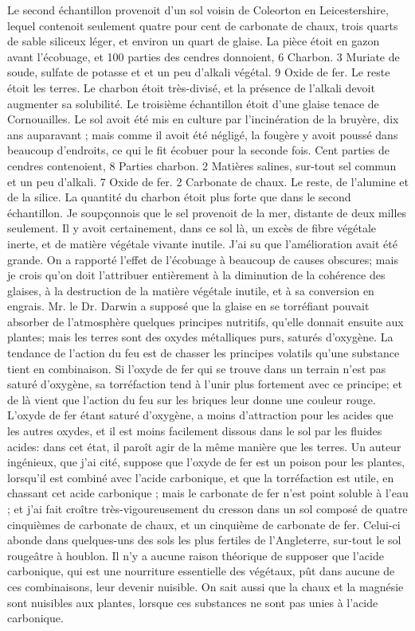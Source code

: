 Le second échantillon provenoit d'un sol voisin de Coleorton en Leicestershire, lequel contenoit seulement quatre pour cent de carbonate de chaux, trois quarts de sable siliceux léger, et environ un quart de glaise. La pièce étoit en gazon avant l'écobuage, et
100 parties des cendres donnoient,
6 Charbon.
\setcounter{page}{274}3 Muriate de soude, sulfate de potasse et et un peu d'alkali végétal.
9 Oxide de fer.
Le reste étoit les terres.
Le charbon étoit très-divisé, et la présence de l'alkali devoit augmenter sa solubilité.
Le troisième échantillon étoit d'une glaise tenace de Cornouailles. Le sol avoit été mis en culture par l'incinération de la bruyère, dix ans auparavant ; mais comme il avoit été négligé, la fougère y avoit poussé dans beaucoup d'endroits, ce qui le fit écobuer pour la seconde fois. Cent parties de cendres contenoient,
8 Parties charbon.
2 Matières salines, sur-tout sel commun et un peu d'alkali.
7 Oxide de fer.
2 Carbonate de chaux.
Le reste, de l'alumine et de la silice.
La quantité du charbon étoit plus forte que dans le second échantillon. Je soupçonnois que le sel provenoit de la mer, distante de deux milles seulement. Il y avoit certainement, dans ce sol là, un excès de fibre végétale inerte, et de matière végétale vivante\setcounter{page}{275} inutile. J'ai su que l'amélioration avait été grande. On a rapporté l'effet de l'écobuage à beaucoup de causes obscures; mais je crois qu'on doit l'attribuer entièrement à la diminution de la cohérence des glaises, à la destruction de la matière végétale inutile, et à sa conversion en engrais. Mr. le Dr. Darwin a supposé que la glaise en se torréfiant pouvait absorber de l'atmosphère quelques principes nutritifs, qu'elle donnait ensuite aux plantes; mais les terres sont des oxydes métalliques purs, saturés d'oxygène. La tendance de l'action du feu est de chasser les principes volatils qu'une substance tient en combinaison. Si l'oxyde de fer qui se trouve dans un terrain n'est pas saturé d'oxygène, sa torréfaction tend à l'unir plus fortement avec ce principe; et de là vient que l'action du feu sur les briques leur donne une couleur rouge. L'oxyde de fer étant saturé d'oxygène, a moins d'attraction pour les acides que les autres oxydes, et il est moins facilement dissous dans le sol par les fluides acides: dans cet état, il paroît agir de la même manière que les terres. Un auteur ingénieux, que j'ai cité, suppose que l'oxyde de fer est un poison pour les plantes, lorsqu'il est combiné avec l'acide carbonique,\setcounter{page}{276} et que la torréfaction est utile, en chassant cet acide carbonique ; mais le carbonate de fer n'est point soluble à l'eau ; et j'ai fait croître très-vigoureusement du cresson dans un sol composé de quatre cinquièmes de carbonate de chaux, et un cinquième de carbonate de fer. Celui-ci abonde dans quelques-uns des sols les plus fertiles de l'Angleterre, sur-tout le sol rougeâtre à houblon. Il n'y a aucune raison théorique de supposer que l'acide carbonique, qui est une nourriture essentielle des végétaux, pût dans aucune de ces combinaisons, leur devenir nuisible. On sait aussi que la chaux et la magnésie sont nuisibles aux plantes, lorsque ces substances ne sont pas unies à l'acide carbonique.
